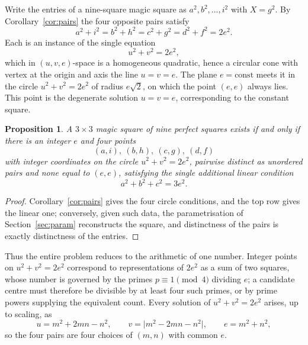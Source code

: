\documentclass[12pt]{article}
\newtheorem{proposition}[theorem]{Proposition}
\theoremstyle{remark}
\begin{document}
Write the entries of a nine-square magic square as $a^2, b^2, \dots, i^2$
with $X = g^2$. By Corollary~\ref{cor:pairs} the four opposite pairs
satisfy
\[
a^2 + i^2 = b^2 + h^2 = c^2 + g^2 = d^2 + f^2 = 2e^2 .
\]
Each is an instance of the single equation
\[
u^2 + v^2 = 2e^2 ,
\]
which in $(u,v,e)$-space is a homogeneous quadratic, hence a circular
cone with vertex at the origin and axis the line $u = v = e$. The plane
$e = \text{const}$ meets it in the circle $u^2 + v^2 = 2e^2$ of radius
$e\sqrt2$, on which the point $(e,e)$ always lies. This point is the
degenerate solution $u = v = e$, corresponding to the constant square.

\begin{center}
\end{center}

\begin{proposition}
A $3\times3$ magic square of nine perfect squares exists if and only if
there is an integer $e$ and four points
\[
(a,i),\ (b,h),\ (c,g),\ (d,f)
\]
with integer coordinates on the circle $u^2+v^2 = 2e^2$, pairwise
distinct as unordered pairs and none equal to $(e,e)$, satisfying the
single additional linear condition
\[
a^2 + b^2 + c^2 = 3e^2 .
\]
\end{proposition}

\begin{proof}
Corollary~\ref{cor:pairs} gives the four circle conditions, and the top
row gives the linear one; conversely, given such data, the
parametrisation of Section~\ref{sec:param} reconstructs the square, and
distinctness of the pairs is exactly distinctness of the entries.
\end{proof}

Thus the entire problem reduces to the arithmetic of one number.
Integer points on $u^2+v^2 = 2e^2$ correspond to representations of
$2e^2$ as a sum of two squares, whose number is governed by the primes
$p \equiv 1 \pmod 4$ dividing $e$; a candidate centre must therefore be
divisible by at least four such primes, or by prime powers supplying
the equivalent count. Every solution of $u^2+v^2=2e^2$ arises, up to
scaling, as
\[
u = m^2 + 2mn - n^2, \qquad
v = \lvert m^2 - 2mn - n^2 \rvert, \qquad
e = m^2 + n^2 ,
\]
so the four pairs are four choices of $(m,n)$ with common $e$.
\end{document}
